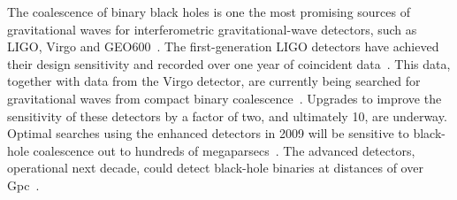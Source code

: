 

The coalescence of binary black holes is one the most promising
sources of gravitational waves for interferometric gravitational-wave
detectors, such as LIGO, Virgo and GEO600~\cite{thorne.k:1987}. The
first-generation LIGO detectors have achieved their design sensitivity
and recorded over one year of coincident data~\cite{Abbott:2007kva}.
This data, together with data from the Virgo detector, are currently
being searched for gravitational waves from compact binary
coalescence~\cite{Abbott:2003pj,Abbott:2005pe,Abbott:2005pf,%
  Abbott:2007xi,Abbott:2007ai,Abbott:2008}.  Upgrades to improve the sensitivity
of these detectors by a factor of two, and ultimately 10, are
underway.  Optimal searches using the enhanced detectors in 2009 will
be sensitive to black-hole coalescence out to hundreds of
megaparsecs~\cite{LIGOEnhancedLIGO}. The advanced detectors,
operational next decade, could detect black-hole binaries at distances
of over \unit[1]{Gpc}~\cite{Fritschel:2003qw}.
